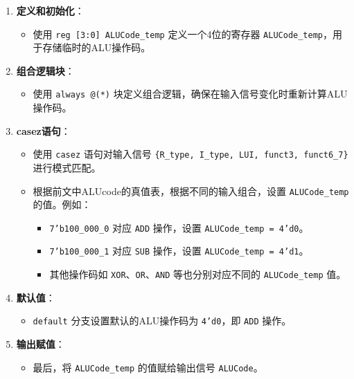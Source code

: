 \documentclass[12pt,hyperref,a4paper,UTF8]{ctexart}
\begin{document}
\begin{enumerate}
    \item \textbf{定义和初始化}：
    \begin{itemize}
        \item 使用 \texttt{reg [3:0] ALUCode\_temp} 定义一个4位的寄存器 \texttt{ALUCode\_temp}，用于存储临时的ALU操作码。
    \end{itemize}

    \item \textbf{组合逻辑块}：
    \begin{itemize}
        \item 使用 \texttt{always @(*)} 块定义组合逻辑，确保在输入信号变化时重新计算ALU操作码。
    \end{itemize}

    \item \textbf{casez语句}：
    \begin{itemize}
        \item 使用 \texttt{casez} 语句对输入信号 \texttt{\{R\_type, I\_type, LUI, funct3, funct6\_7\}} 进行模式匹配。
        \item 根据前文中ALUcode的真值表，根据不同的输入组合，设置 \texttt{ALUCode\_temp} 的值。例如：
        \begin{itemize}
            \item \texttt{7'b100\_000\_0} 对应 \texttt{ADD} 操作，设置 \texttt{ALUCode\_temp = 4'd0}。
            \item \texttt{7'b100\_000\_1} 对应 \texttt{SUB} 操作，设置 \texttt{ALUCode\_temp = 4'd1}。
            \item 其他操作码如 \texttt{XOR}、\texttt{OR}、\texttt{AND} 等也分别对应不同的 \texttt{ALUCode\_temp} 值。
        \end{itemize}
    \end{itemize}

    \item \textbf{默认值}：
    \begin{itemize}
        \item \texttt{default} 分支设置默认的ALU操作码为 \texttt{4'd0}，即 \texttt{ADD} 操作。
    \end{itemize}

    \item \textbf{输出赋值}：
    \begin{itemize}
        \item 最后，将 \texttt{ALUCode\_temp} 的值赋给输出信号 \texttt{ALUCode}。
    \end{itemize}
\end{enumerate}
\end{document}
